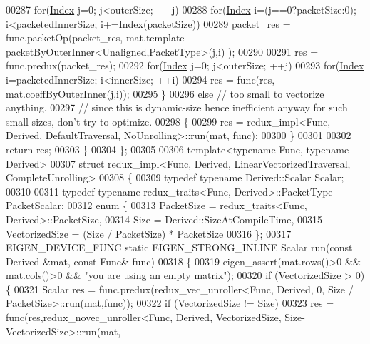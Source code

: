 \begin{DoxyCode}
00287       \textcolor{keywordflow}{for}(\hyperlink{namespace_eigen_a62e77e0933482dafde8fe197d9a2cfde}{Index} j=0; j<outerSize; ++j)
00288         \textcolor{keywordflow}{for}(\hyperlink{namespace_eigen_a62e77e0933482dafde8fe197d9a2cfde}{Index} i=(j==0?packetSize:0); i<packetedInnerSize; i+=\hyperlink{namespace_eigen_a62e77e0933482dafde8fe197d9a2cfde}{Index}(packetSize))
00289           packet\_res = func.packetOp(packet\_res, mat.template packetByOuterInner<Unaligned,PacketType>(j,i)
      );
00290 
00291       res = func.predux(packet\_res);
00292       \textcolor{keywordflow}{for}(\hyperlink{namespace_eigen_a62e77e0933482dafde8fe197d9a2cfde}{Index} j=0; j<outerSize; ++j)
00293         \textcolor{keywordflow}{for}(\hyperlink{namespace_eigen_a62e77e0933482dafde8fe197d9a2cfde}{Index} i=packetedInnerSize; i<innerSize; ++i)
00294           res = func(res, mat.coeffByOuterInner(j,i));
00295     \}
00296     \textcolor{keywordflow}{else} \textcolor{comment}{// too small to vectorize anything.}
00297          \textcolor{comment}{// since this is dynamic-size hence inefficient anyway for such small sizes, don't try to
       optimize.}
00298     \{
00299       res = redux\_impl<Func, Derived, DefaultTraversal, NoUnrolling>::run(mat, func);
00300     \}
00301 
00302     \textcolor{keywordflow}{return} res;
00303   \}
00304 \};
00305 
00306 \textcolor{keyword}{template}<\textcolor{keyword}{typename} Func, \textcolor{keyword}{typename} Derived>
00307 \textcolor{keyword}{struct }redux\_impl<Func, Derived, LinearVectorizedTraversal, CompleteUnrolling>
00308 \{
00309   \textcolor{keyword}{typedef} \textcolor{keyword}{typename} Derived::Scalar Scalar;
00310 
00311   \textcolor{keyword}{typedef} \textcolor{keyword}{typename} redux\_traits<Func, Derived>::PacketType PacketScalar;
00312   \textcolor{keyword}{enum} \{
00313     PacketSize = redux\_traits<Func, Derived>::PacketSize,
00314     Size = Derived::SizeAtCompileTime,
00315     VectorizedSize = (Size / PacketSize) * PacketSize
00316   \};
00317   EIGEN\_DEVICE\_FUNC \textcolor{keyword}{static} EIGEN\_STRONG\_INLINE Scalar run(\textcolor{keyword}{const} Derived &mat, \textcolor{keyword}{const} Func& func)
00318   \{
00319     eigen\_assert(mat.rows()>0 && mat.cols()>0 && \textcolor{stringliteral}{"you are using an empty matrix"});
00320     \textcolor{keywordflow}{if} (VectorizedSize > 0) \{
00321       Scalar res = func.predux(redux\_vec\_unroller<Func, Derived, 0, Size / PacketSize>::run(mat,func));
00322       \textcolor{keywordflow}{if} (VectorizedSize != Size)
00323         res = func(res,redux\_novec\_unroller<Func, Derived, VectorizedSize, Size-VectorizedSize>::run(mat,

\end{DoxyCode}
